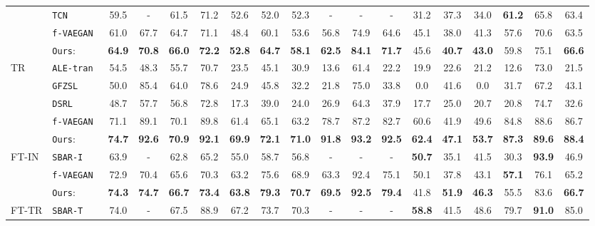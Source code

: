 \documentclass[runningheads]{llncs}
\newcommand{\vaegan}{\texttt{f-VAEGAN}}
\begin{document}
\begin{table}[t]
{\begin{tabular}{llcccc|ccc|ccc|ccc|ccc}
 & \texttt{TCN}~\cite{jiang2019transferable} & 59.5 & - & 61.5 & 71.2 & 52.6 & 52.0 & 52.3 & - & - & - & 31.2 & 37.3 & 34.0 & \textbf{61.2} & 65.8 &  63.4  \\
 & \vaegan~\cite{Xian19cvpr} & 61.0 & 67.7 & 64.7 & 71.1 & 48.4 & 60.1 & 53.6 & 56.8 & 74.9 & 64.6 & 45.1 & 38.0 & 41.3 & 57.6 & 70.6 &  63.5  \\
 & \texttt{Ours}:  & \textbf{64.9} & \textbf{70.8} & \textbf{66.0}  & \textbf{72.2}  & \textbf{52.8}  &  \textbf{64.7} & \textbf{58.1}  & \textbf{62.5}  & \textbf{84.1}  & \textbf{71.7} & 45.6  & \textbf{40.7}  & \textbf{43.0}  & 59.8 & 75.1 & \textbf{66.6}  \\
 \hline
\multirow{5}{*}{TR} & \texttt{ALE-tran}~\cite{zsl-good-bad-ugly} & 54.5 & 48.3 & 55.7 & 70.7 & 23.5 & 45.1 & 30.9 & 13.6 & 61.4 & 22.2 & 19.9 & 22.6  & 21.2 & 12.6 & 73.0 & 21.5 \\
 & \texttt{GFZSL}~\cite{verma17simple} & 50.0 & 85.4 & 64.0 & 78.6 & 24.9 & 45.8 & 32.2 & 21.8 & 75.0 & 33.8 & 0.0 & 41.6 & 0.0 & 31.7 & 67.2 & 43.1 \\
 & \texttt{DSRL}~\cite{Ye17cvpr} & 48.7 & 57.7 & 56.8 & 72.8 & 17.3 & 39.0 & 24.0 & 26.9 & 64.3 & 37.9 & 17.7 & 25.0 & 20.7 & 20.8 & 74.7 & 32.6  \\
 & \vaegan~\cite{Xian19cvpr} & 71.1 & 89.1 & 70.1 & 89.8 & 61.4 & 65.1 &  63.2 & 78.7 & 87.2 & 82.7 & 60.6 & 41.9 & 49.6 & 84.8 & 88.6  & 86.7  \\
 & \texttt{Ours}:  & \textbf{74.7} & \textbf{92.6} & \textbf{70.9}  & \textbf{92.1} & \textbf{69.9}  & \textbf{72.1} & \textbf{71.0}  & \textbf{91.8}  & \textbf{93.2} & \textbf{92.5}  & \textbf{62.4} & \textbf{47.1} & \textbf{53.7} & \textbf{87.3}  & \textbf{89.6}  & \textbf{88.4} \\
\hline \hline
\multirow{3}{*}{FT-IN} & \texttt{SBAR-I}~\cite{paul2019semantically} & 63.9 & - & 62.8 & 65.2 & 55.0 & 58.7 & 56.8 & - & - & - & \textbf{50.7} & 35.1 & 41.5 & 30.3 & \textbf{93.9} & 46.9  \\
& \texttt{\vaegan}~\cite{Xian19cvpr} & 72.9 &70.4& 65.6 &70.3& 63.2& 75.6& 68.9& 63.3 &92.4& 75.1 & 50.1& 37.8 & 43.1& \textbf{57.1}& 76.1& 65.2 \\
& \texttt{Ours}:  & \textbf{74.3} & \textbf{74.7} & \textbf{66.7}  & \textbf{73.4} & \textbf{63.8}  & \textbf{79.3} & \textbf{70.7} & \textbf{69.5} & \textbf{92.5}  & \textbf{79.4} & 41.8  & \textbf{51.9}  & \textbf{46.3}  & 55.5 & 83.6 & \textbf{66.7} \\
 \hline
\multirow{4}{*}{FT-TR} & 
\texttt{SBAR-T}~\cite{paul2019semantically} & 74.0 & - & 67.5 & 88.9 & 67.2 & 73.7 & 70.3 & - & - & - & \textbf{58.8} & 41.5 & 48.6 & 79.7 & \textbf{91.0} & 85.0  \\


\end{tabular}}
\end{table}
\end{document}
